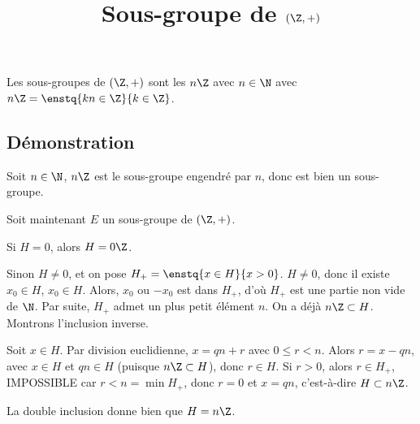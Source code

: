 \documentclass[fontsize=12pt,twoside=false,parskip=half, french]{scrartcl}
\title{Sous-groupe de $(\Z, +)$}
\date{}
\author{}
\begin{document}
\maketitle
   \begin{Theoreme}
      Les sous-groupes de $(\Z, +)$ sont les $n\Z$ avec $n \in \N$ avec $n\Z = \enstq{kn \in \Z}{k \in \Z}$.
   \end{Theoreme}
   \subsection{Démonstration}
      Soit $n \in \N$, $n\Z$ est le sous-groupe engendré par $n$, donc est bien un sous-groupe.

      Soit maintenant $E$ un sous-groupe de $(\Z, +)$.
      
      Si $H = {0}$, alors $H = 0\Z$.

      Sinon $H \neq {0}$, et on pose $H_+ = \enstq{x \in H}{x > 0}$. $H \neq {0}$, donc il existe $x_0 \in H$, $x_0 \in H$.
      Alors, $x_0$ ou $-x_0$ est dans $H_+$, d’où $H_+$ est une partie non vide de $\N$. Par suite, $H_+$ admet un plus 
      petit élément $n$. On a déjà $n\Z \subset H$. Montrons l’inclusion inverse.
      
      Soit $x \in H$. Par division euclidienne, $x = qn + r$ avec $0 \leq r < n$. Alors $r = x - qn$, avec $x \in H$ et 
      $qn \in H$ (puisque $n\Z \subset H$), donc $r \in H$. Si $r > 0$, alors $r \in H_+$, IMPOSSIBLE car $r < n = \min H_+$,
      donc $r = 0$ et $x = qn$, c’est-à-dire $H \subset n\Z$.
      
      La double inclusion donne bien que $H = n\Z$.
\end{document}
